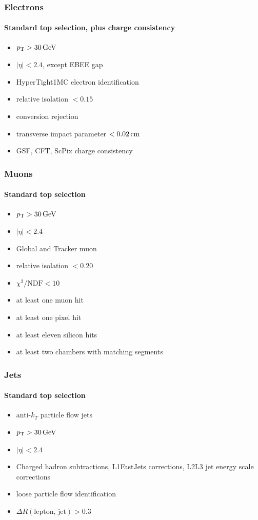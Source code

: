 \documentclass[ukenglish]{beamer}
\begin{document}
\begin{frame}
    \frametitle{Electrons}
    \framesubtitle{Standard top selection, plus charge consistency}
    \begin{itemize}
        \item $\pt > \unit[30]{GeV}$
        \item $|\eta| < 2.4$, except EBEE gap
        \item HyperTight1MC electron identification
        \item relative isolation $< 0.15$
        \item conversion rejection
        \item transverse impact parameter $< \unit[0.02]{cm}$
        \item GSF, CFT, ScPix charge consistency
    \end{itemize}
\end{frame}

\begin{frame}
    \frametitle{Muons}
    \framesubtitle{Standard top selection}
    \begin{itemize}
        \item $\pt > \unit[30]{GeV}$
        \item $|\eta| < 2.4$
        \item Global and Tracker muon
        \item relative isolation $< 0.20$
        \item $\chi^2/\text{NDF} < 10$
        \item at least one muon hit
        \item at least one pixel hit
        \item at least eleven silicon hits
        \item at least two chambers with matching segments
    \end{itemize}
\end{frame}

\begin{frame}
    \frametitle{Jets}
    \framesubtitle{Standard top selection}
    \begin{itemize}
        \item anti-$k_T$ particle flow jets
        \item $\pt > \unit[30]{GeV}$
        \item $|\eta| < 2.4$
        \item Charged hadron subtractions, L1FastJets corrections,
            L2L3 jet energy scale corrections
        \item loose particle flow identification
        \item $\Delta R(\text{lepton, jet}) > 0.3$
    \end{itemize}
\end{frame}
\end{document}
